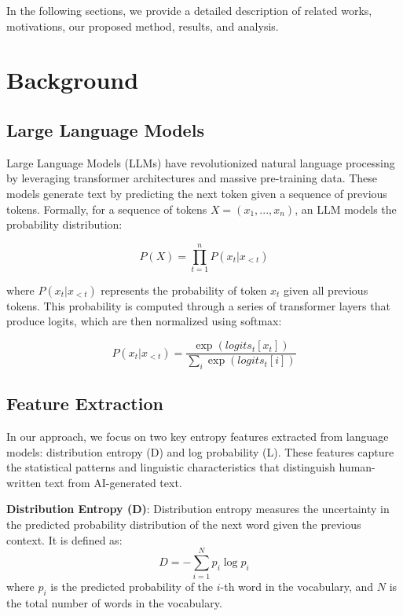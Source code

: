    In the following sections, we provide a detailed description of related works, motivations, our proposed method, results, and analysis.
    
    \section{Background}
\label{Background}

\subsection{Large Language Models}
Large Language Models (LLMs) have revolutionized natural language processing by leveraging transformer architectures and massive pre-training data. These models generate text by predicting the next token given a sequence of previous tokens. Formally, for a sequence of tokens $X = (x_1, ..., x_n)$, an LLM models the probability distribution:

\begin{equation}
    P(X) = \prod_{t=1}^n P(x_t|x_{<t})
\end{equation}

where $P(x_t|x_{<t})$ represents the probability of token $x_t$ given all previous tokens. This probability is computed through a series of transformer layers that produce logits, which are then normalized using softmax:

\begin{equation}
    P(x_t|x_{<t}) = \frac{\exp(logits_t[x_t])}{\sum_{i}\exp(logits_t[i])}
\end{equation}

\subsection{Feature Extraction}
In our approach, we focus on two key entropy features extracted from language models: distribution entropy (D) and log probability (L). These features capture the statistical patterns and linguistic characteristics that distinguish human-written text from AI-generated text.

\textbf{Distribution Entropy (D)}: Distribution entropy measures the uncertainty in the predicted probability distribution of the next word given the previous context. It is defined as:
\begin{equation}
D = -\sum_{i=1}^{N} p_i \log p_i
\end{equation}
where \( p_i \) is the predicted probability of the \( i \)-th word in the vocabulary, and \( N \) is the total number of words in the vocabulary.

